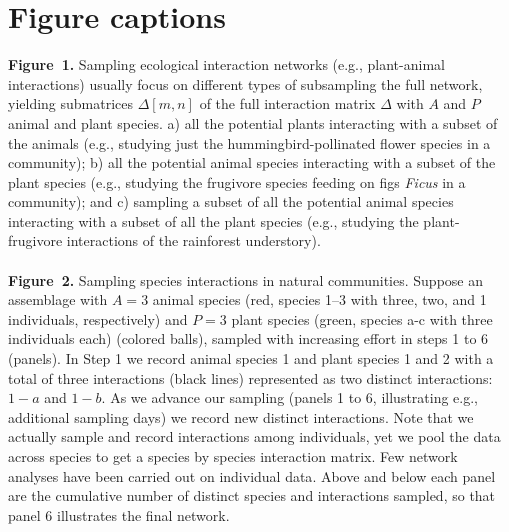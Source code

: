 \documentclass[12pt]{article}
\begin{document}
\section*{Figure captions}
\noindent \textbf{Figure~1.} Sampling ecological interaction networks (e.g., plant-animal interactions) usually focus on different types of subsampling the full network, yielding submatrices $\Delta[m,n]$ of the full interaction matrix $\Delta$ with $A$ and $P$ animal and plant species. a) all the potential plants interacting with a subset of the animals (e.g., studying just the hummingbird-pollinated flower species in a community); b) all the potential animal species interacting with a subset of the plant species (e.g., studying the frugivore species feeding on figs \emph{Ficus} in a community); and c) sampling a subset of all the potential animal species interacting with a subset of all the plant species (e.g., studying the plant-frugivore interactions of the rainforest understory). \\\\
\noindent \textbf{Figure~2.} Sampling species interactions in natural communities. Suppose an assemblage with $A= 3$ animal species (red, species 1--3 with three, two, and 1 individuals, respectively) and $P= 3$ plant species (green, species a-c with three individuals each) (colored balls), sampled with increasing effort in steps 1 to 6 (panels). In Step 1 we record animal species 1 and plant species 1 and 2 with a total of three interactions (black lines) represented as two distinct interactions: $1-a$ and $1-b$. As we advance our sampling (panels 1 to 6, illustrating e.g., additional sampling days) we record new distinct interactions. Note that we actually sample and record interactions among individuals, yet we pool the data across species to get a species by species interaction matrix. Few network analyses have been carried out on individual data\citep{Dupont:2014ex}. Above and below each panel are the cumulative number of distinct species and interactions sampled, so that panel 6 illustrates the final network. \\
\newpage
\end{document}
